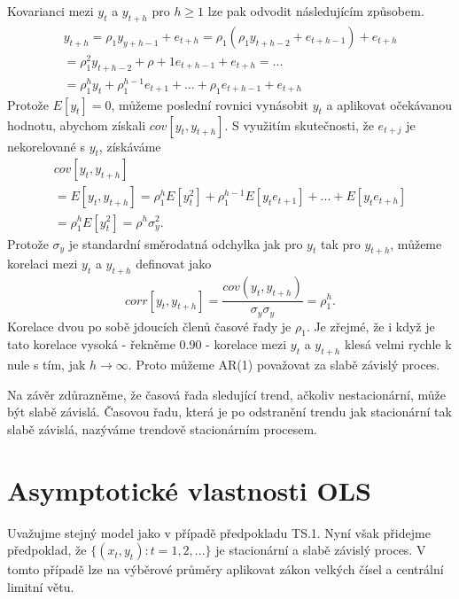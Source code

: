 Kovarianci mezi $y_t$ a $y_{t + h}$ pro $h \ge 1$ lze pak odvodit 
následujícím způsobem.
\begin{multline}
y_{t + h} = \rho_1 y_{y + h - 1} + e_{t + h} = \rho_1(\rho_1 y_{t + h - 
2} + e_{t + h -1}) + e_{t + h}\\
= \rho_1^2 y_{t + h - 2} + \rho+1 e_{t + h - 1} + e_{t + h} = ...\\
= \rho_1^h y_t + \rho_1^{h - 1} e_{t + 1} + ... + \rho_1 e_{t + h - 1} 
+ e_{t + h}
\end{multline}
Protože $E[y_t] = 0$, můžeme poslední rovnici vynásobit $y_t$ a 
aplikovat očekávanou hodnotu, abychom získali $cov[y_t, y_{t + h}]$. 
S využitím skutečnosti, že $e_{t + j}$ je nekorelované s $y_t$, 
získáváme
\begin{multline}
  cov[y_t, y_{t + h}]\\
  = E[y_t, y_{t + h}] = \rho_1^h E[y_t^2] + \rho_1^{h 
- 1} E[y_t e_{t + 1}] + ... + E[y_t e_{t + h}]\\
= \rho_1^h E[y_t^2] = \rho^h \sigma_y^2.
\end{multline}
Protože $\sigma_y$ je standardní směrodatná odchylka jak pro $y_t$ 
tak pro $y_{t + h}$, můžeme korelaci mezi $y_t$ a $y_{t + h}$ 
definovat jako
\begin{equation}
corr[y_t, y_{t + h}] = \frac{cov(y_t, y_{t + h})}{\sigma_y \sigma_y} = 
\rho_1^h.
\end{equation}
Korelace dvou po sobě jdoucích členů časové řady je $\rho_1$. Je 
zřejmé, že i když je tato korelace vysoká - řekněme 0.90 - 
korelace mezi $y_t$ a $y_{t + h}$ klesá velmi rychle k nule s tím, 
jak $h \rightarrow \infty$. Proto můžeme AR(1) považovat za slabě 
závislý proces.

Na závěr zdůrazněme, že časová řada sledující trend, 
ačkoliv nestacionární, může být slabě závislá. Časovou řadu, 
která je po odstranění trendu jak stacionární tak slabě 
závislá, nazýváme trendově stacionárním procesem.

\section{Asymptotické vlastnosti OLS}

\begin{assumption}
Uvažujme stejný model jako v případě předpokladu TS.1. Nyní však přidejme předpoklad, že $\{(x_t, y_t): t = 1, 2, ...\}$ je stacionární a slabě závislý proces. V tomto případě lze na výběrové průměry aplikovat zákon velkých čísel a centrální limitní větu.

\raggedleft{$\clubsuit$}
\end{assumption}

